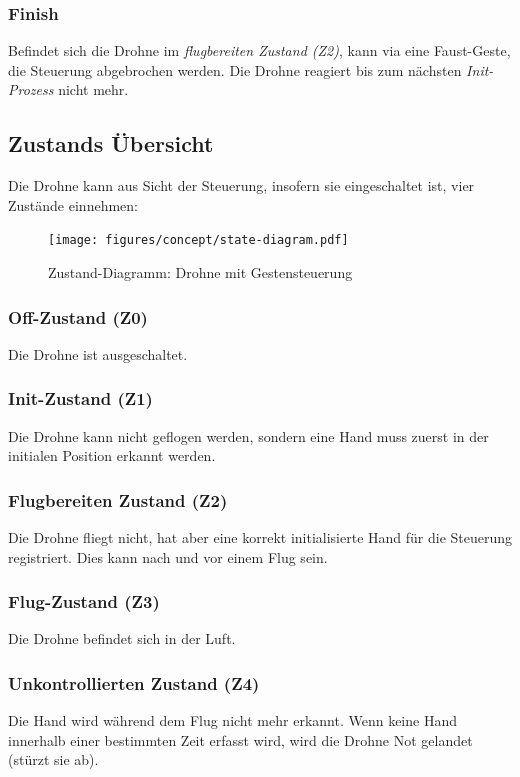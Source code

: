 \subsubsection{Finish}
Befindet sich die Drohne im \textit{flugbereiten Zustand (Z2)}, kann via eine Faust-Geste, die Steuerung abgebrochen werden.
Die Drohne reagiert bis zum nächsten \textit{Init-Prozess} nicht mehr.

\subsection{Zustands Übersicht}
Die Drohne kann aus Sicht der Steuerung, insofern sie eingeschaltet ist, vier Zustände einnehmen:

\begin{figure}[H]
	\centering
	\texttt{[image: figures/concept/state-diagram.pdf]}
	\caption[Zustand-Diagramm: Drohne mit Gestensteuerung]{Zustand-Diagramm: Drohne mit Gestensteuerung}
\end{figure}

\subsubsection{Off-Zustand (Z0)}
Die Drohne ist ausgeschaltet.

\subsubsection{Init-Zustand (Z1)}
Die Drohne kann nicht geflogen werden, sondern eine Hand muss zuerst in der initialen Position erkannt werden.

\subsubsection{Flugbereiten Zustand (Z2)}
Die Drohne fliegt nicht, hat aber eine korrekt initialisierte Hand für die Steuerung registriert. Dies kann nach und vor einem Flug sein.

\subsubsection{Flug-Zustand (Z3)}
Die Drohne befindet sich in der Luft.

\subsubsection{Unkontrollierten Zustand (Z4)}
Die Hand wird während dem Flug nicht mehr erkannt.
Wenn keine Hand innerhalb einer bestimmten Zeit erfasst wird, wird die Drohne Not gelandet (stürzt sie ab).

